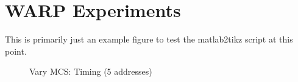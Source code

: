 
\section{WARP Experiments}



This is primarily just an example figure to test the matlab2tikz script at this point.\\

\begin{figure}[H]
	\centering
	\setlength\figureheight{5cm}
	\setlength{}
	
	\caption[vary\_mcs-timing-5\_addresses]{Vary MCS: Timing (5 addresses)}
	\label{fig:vary_mcs-timing-5_addresses}
\end{figure}
